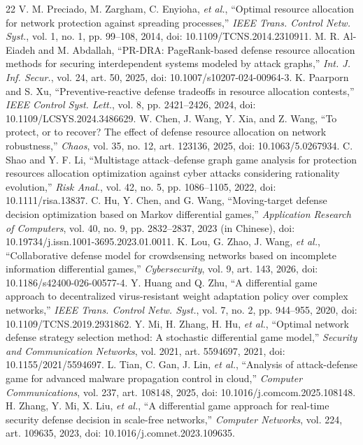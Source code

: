 \documentclass[conference,letterpaper]{IEEEtran}
\begin{document}
\begin{thebibliography}{22}
 V. M. Preciado, M. Zargham, C. Enyioha, \emph{et al.}, ``Optimal resource allocation for network protection against spreading processes,'' \emph{IEEE Trans. Control Netw. Syst.}, vol. 1, no. 1, pp. 99--108, 2014, doi: 10.1109/TCNS.2014.2310911.
 M. R. Al-Eiadeh and M. Abdallah, ``PR-DRA: PageRank-based defense resource allocation methods for securing interdependent systems modeled by attack graphs,'' \emph{Int. J. Inf. Secur.}, vol. 24, art. 50, 2025, doi: 10.1007/s10207-024-00964-3.
 K. Paarporn and S. Xu, ``Preventive-reactive defense tradeoffs in resource allocation contests,'' \emph{IEEE Control Syst. Lett.}, vol. 8, pp. 2421--2426, 2024, doi: 10.1109/LCSYS.2024.3486629.
 W. Chen, J. Wang, Y. Xia, and Z. Wang, ``To protect, or to recover? The effect of defense resource allocation on network robustness,'' \emph{Chaos}, vol. 35, no. 12, art. 123136, 2025, doi: 10.1063/5.0267934.
 C. Shao and Y. F. Li, ``Multistage attack--defense graph game analysis for protection resources allocation optimization against cyber attacks considering rationality evolution,'' \emph{Risk Anal.}, vol. 42, no. 5, pp. 1086--1105, 2022, doi: 10.1111/risa.13837.
 C. Hu, Y. Chen, and G. Wang, ``Moving-target defense decision optimization based on Markov differential games,'' \emph{Application Research of Computers}, vol. 40, no. 9, pp. 2832--2837, 2023 (in Chinese), doi: 10.19734/j.issn.1001-3695.2023.01.0011.
 K. Lou, G. Zhao, J. Wang, \emph{et al.}, ``Collaborative defense model for crowdsensing networks based on incomplete information differential games,'' \emph{Cybersecurity}, vol. 9, art. 143, 2026, doi: 10.1186/s42400-026-00577-4.
 Y. Huang and Q. Zhu, ``A differential game approach to decentralized virus-resistant weight adaptation policy over complex networks,'' \emph{IEEE Trans. Control Netw. Syst.}, vol. 7, no. 2, pp. 944--955, 2020, doi: 10.1109/TCNS.2019.2931862.
 Y. Mi, H. Zhang, H. Hu, \emph{et al.}, ``Optimal network defense strategy selection method: A stochastic differential game model,'' \emph{Security and Communication Networks}, vol. 2021, art. 5594697, 2021, doi: 10.1155/2021/5594697.
 L. Tian, C. Gan, J. Lin, \emph{et al.}, ``Analysis of attack-defense game for advanced malware propagation control in cloud,'' \emph{Computer Communications}, vol. 237, art. 108148, 2025, doi: 10.1016/j.comcom.2025.108148.
 H. Zhang, Y. Mi, X. Liu, \emph{et al.}, ``A differential game approach for real-time security defense decision in scale-free networks,'' \emph{Computer Networks}, vol. 224, art. 109635, 2023, doi: 10.1016/j.comnet.2023.109635.

\end{thebibliography}
\end{document}
